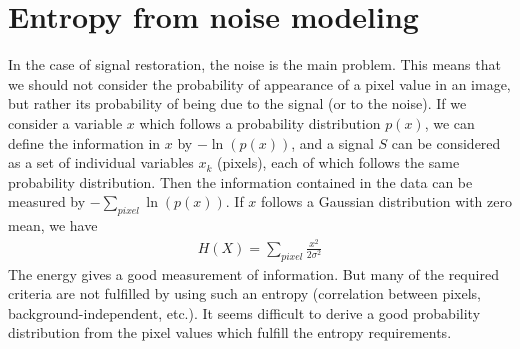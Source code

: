\documentclass[11pt,a4paper]{article}
\begin{document}
\section{Entropy from noise modeling}
 
In the case of signal restoration, the noise is the main problem. This 
means that we should not consider the probability of appearance of 
a pixel value in an image, but rather its probability of being due to the
signal (or to the noise). 
If we consider a variable $x$ which follows a probability distribution 
$p(x)$, we
can define the information in $x$ by $- \ln(p(x))$, and a signal $S$ can
be considered as a set of individual variables $x_k$ (pixels), each of which 
follows the same probability distribution. 
Then the information contained in the data 
can be measured by $- \sum_{pixel} \ln(p(x))$. If $x$ follows a Gaussian 
distribution with zero mean, we have
\begin{eqnarray}
H(X) = \sum_{pixel} \frac{x^2}{2 \sigma^2}
\end{eqnarray}
The energy gives a good measurement of information. But many of the required
criteria are not fulfilled by using such an entropy (correlation between 
pixels, background-independent, etc.). It seems difficult to derive
a good probability distribution from the pixel values which fulfill the 
entropy requirements.
\end{document}

